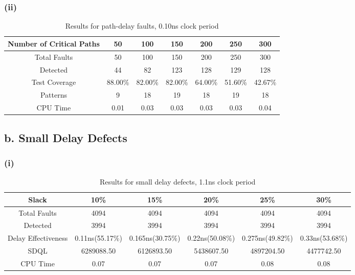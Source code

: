 \documentclass[letterpaper]{article} %
\begin{document}
\subsubsection*{(ii)}

\begin{table}[ht]
\centering
\begin{tabular}{|c|c|c|c|c|c|c|}
\hline
Number of Critical Paths & 50      & 100     & 150     & 200     & 250     & 300     \\ \hline
Total Faults             & 50      & 100     & 150     & 200     & 250     & 300     \\ \hline
Detected                 & 44      & 82      & 123     & 128     & 129     & 128     \\ \hline
Test Coverage            & 88.00\% & 82.00\% & 82.00\% & 64.00\% & 51.60\% & 42.67\% \\ \hline
Patterns                 & 9       & 18      & 19      & 18      & 19      & 18      \\ \hline
CPU Time                 & 0.01    & 0.03    & 0.03    & 0.03    & 0.03    & 0.04    \\ \hline
\end{tabular}
\caption{Results for path-delay faults, 0.10ns clock period}
\end{table}

\subsection*{b. Small Delay Defects}
\subsubsection*{(i)}
\begin{table}[ht]
\centering
\begin{tabular}{|c|c|c|c|c|c|}
\hline
Slack               & 10\%            & 15\%             & 20\%            & 25\%             & 30\%            \\ \hline
Total Faults        & 4094            & 4094             & 4094            & 4094             & 4094            \\ \hline
Detected            & 3994            & 3994             & 3994            & 3994             & 3994            \\ \hline
Delay Effectiveness & 0.11ns(55.17\%) & 0.165ns(30.75\%) & 0.22ns(50.08\%) & 0.275ns(49.82\%) & 0.33ns(53.68\%) \\ \hline
SDQL                & 6289088.50      & 6126893.50       & 5438607.50      & 4897204.50       & 4477742.50      \\ \hline
CPU Time            & 0.07            & 0.07             & 0.07            & 0.08             & 0.08            \\ \hline
\end{tabular}
\caption{Results for small delay defects, 1.1ns clock period}
\end{table}
\end{document}
